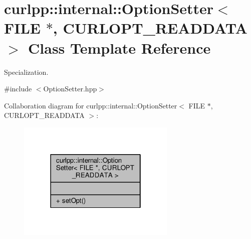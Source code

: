 \hypertarget{classcurlpp_1_1internal_1_1OptionSetter_3_01FILE_01_5_00_01CURLOPT__READDATA_01_4}{\section{curlpp\-:\-:internal\-:\-:Option\-Setter$<$ F\-I\-L\-E $\ast$, C\-U\-R\-L\-O\-P\-T\-\_\-\-R\-E\-A\-D\-D\-A\-T\-A $>$ Class Template Reference}
\label{classcurlpp_1_1internal_1_1OptionSetter_3_01FILE_01_5_00_01CURLOPT__READDATA_01_4}
}


Specialization.  




{\ttfamily \#include $<$Option\-Setter.\-hpp$>$}



Collaboration diagram for curlpp\-:\-:internal\-:\-:Option\-Setter$<$ F\-I\-L\-E $\ast$, C\-U\-R\-L\-O\-P\-T\-\_\-\-R\-E\-A\-D\-D\-A\-T\-A $>$\-:\nopagebreak
\begin{figure}[H]
\begin{center}
\leavevmode
\includegraphics[width=214pt]{classcurlpp_1_1internal_1_1OptionSetter_3_01FILE_01_5_00_01CURLOPT__READDATA_01_4__coll__graph}
\end{center}
\end{figure}
